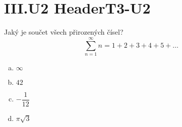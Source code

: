 \documentclass{../../../../style/mkimain}
\begin{document}
\section*{III.U2 HeaderT3-U2}
\noindent Jaký je součet všech přirozených čísel?
$$
\sum_{n=1}^{\infty}n=1+2+3+4+5+\dots
$$
\begin{enumerate}[a)]
    \item $\infty$
    \item $42$
    \item $-\dfrac{1}{12}$
    \item $\pi\sqrt{3}$
\end{enumerate}
\end{document}
